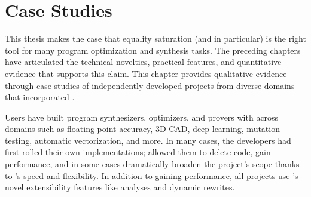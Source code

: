 \chapter{Case Studies}
\label{sec:case-studies}

This thesis makes the case that equality saturation
 (and \egg in particular)
 is the right tool for
 many program optimization and synthesis tasks.
The preceding chapters have articulated the
 technical novelties, practical features,
 and quantitative evidence that supports this claim.
This chapter provides qualitative evidence through case studies
 of independently-developed
 projects\footnotemark{}
 from diverse domains
 that incorporated \egg.

Users have built program synthesizers, optimizers, and provers
 with \egg across domains such as
 floating point accuracy, 3D CAD, deep learning, mutation testing,
 automatic vectorization, and more.
In many cases, the developers had first rolled their own \egraph
 implementations;
 \egg allowed them to delete code, gain performance, and in some cases
 dramatically broaden the project's scope thanks to \egg's speed and
 flexibility.
In addition to gaining performance, all projects use \egg's novel
  extensibility features like \eclass analyses and dynamic rewrites.


 
 
 
 

